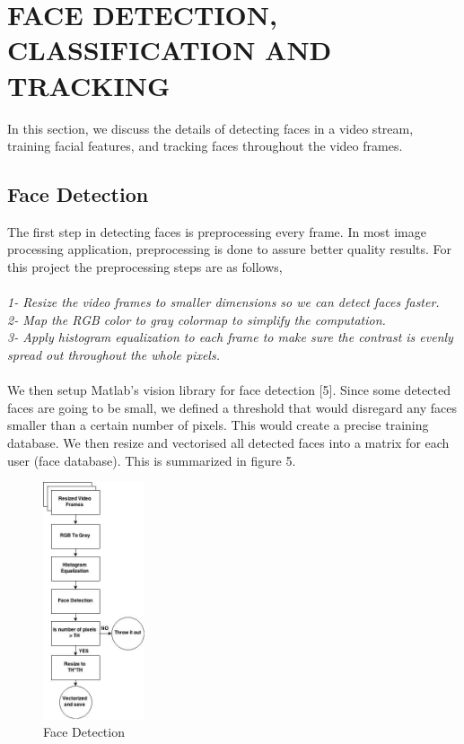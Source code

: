 \documentclass{article}
\begin{document}
\section{FACE DETECTION, CLASSIFICATION AND TRACKING}
In this section, we discuss the details of detecting faces in a video stream, training facial features, and tracking faces throughout the video frames. 
\subsection{Face Detection}
The first step in detecting faces is preprocessing every frame. In most image processing application, preprocessing is done to assure better quality results. For this project the preprocessing steps are as follows, \\ \\
{\it 1- Resize the video frames to smaller dimensions so we can detect faces faster.\\
2- Map the RGB color to gray colormap to simplify the computation. \\
3- Apply histogram equalization to each frame to make sure the contrast is evenly spread out throughout the whole pixels.}\\ \\
We then setup Matlab's vision library for face detection [5]. Since some detected faces are going to be small, we defined a threshold that would disregard any faces smaller than a certain number of pixels. This would create a precise training database. We then resize and vectorised all detected faces into a matrix for each user (face database). This is summarized in figure 5.
\begin{figure}[htb]
\begin{minipage}[b]{0.88\linewidth}
\centering
\centerline{\includegraphics[width=3.0cm]{face_detection.jpg}}
\end{minipage}
\caption{Face Detection}
\label{fig:res}
\end{figure}
\end{document}
